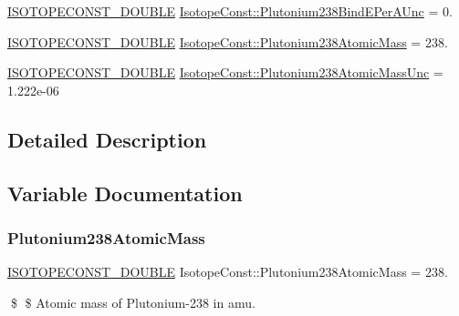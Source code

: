 \begin{DoxyCompactItemize}
\mbox{\hyperlink{group___isotope_const-_macros_ga8f45a7272ce02c0b4c65c44636ed719a}{I\+S\+O\+T\+O\+P\+E\+C\+O\+N\+S\+T\+\_\+\+D\+O\+U\+B\+LE}} \mbox{\hyperlink{group___isotope_const-_plutonium-_pu238_ga82d7b64c47dc61573b1f3e14314326e1}{Isotope\+Const\+::\+Plutonium238\+Bind\+E\+Per\+A\+Unc}} = 0.
\item 
\mbox{\hyperlink{group___isotope_const-_macros_ga8f45a7272ce02c0b4c65c44636ed719a}{I\+S\+O\+T\+O\+P\+E\+C\+O\+N\+S\+T\+\_\+\+D\+O\+U\+B\+LE}} \mbox{\hyperlink{group___isotope_const-_plutonium-_pu238_ga49d6fc1ee1803f73db06c494ad10a65b}{Isotope\+Const\+::\+Plutonium238\+Atomic\+Mass}} = 238.
\item 
\mbox{\hyperlink{group___isotope_const-_macros_ga8f45a7272ce02c0b4c65c44636ed719a}{I\+S\+O\+T\+O\+P\+E\+C\+O\+N\+S\+T\+\_\+\+D\+O\+U\+B\+LE}} \mbox{\hyperlink{group___isotope_const-_plutonium-_pu238_ga4d135cff47f858437a5dd90c12debf85}{Isotope\+Const\+::\+Plutonium238\+Atomic\+Mass\+Unc}} = 1.\+222e-\/06
\end{DoxyCompactItemize}


\subsection{Detailed Description}


\subsection{Variable Documentation}
\mbox{\label{group___isotope_const-_plutonium-_pu238_ga49d6fc1ee1803f73db06c494ad10a65b}} 
\subsubsection{\texorpdfstring{Plutonium238\+Atomic\+Mass}{Plutonium238AtomicMass}}
{\footnotesize\ttfamily \mbox{\hyperlink{group___isotope_const-_macros_ga8f45a7272ce02c0b4c65c44636ed719a}{I\+S\+O\+T\+O\+P\+E\+C\+O\+N\+S\+T\+\_\+\+D\+O\+U\+B\+LE}} Isotope\+Const\+::\+Plutonium238\+Atomic\+Mass = 238.}

\$ \$ Atomic mass of Plutonium-\/238 in amu. \mbox{\label{group___isotope_const-_plutonium-_pu238_ga4d135cff47f858437a5dd90c12debf85}} 
